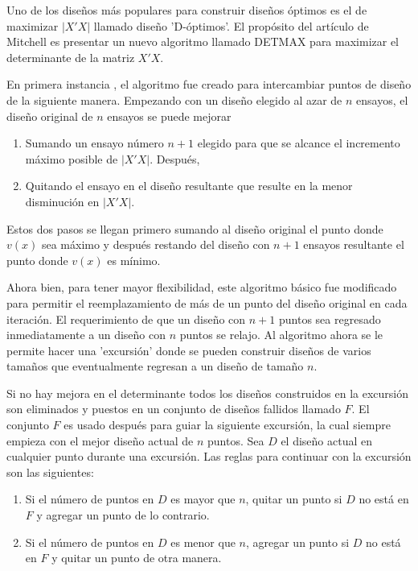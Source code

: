 Uno de los diseños más populares para construir diseños óptimos es el de maximizar $|X'X|$ llamado diseño 'D-óptimos'.  El propósito del artículo de Mitchell es presentar un nuevo algoritmo llamado DETMAX para maximizar el determinante de la matriz $X'X$. 

En primera instancia , el algoritmo fue creado para intercambiar puntos de diseño de la siguiente manera. Empezando con un diseño elegido al azar de $n$ ensayos, el diseño original de $n$ ensayos se puede mejorar 


\begin{enumerate}
	\item Sumando un ensayo número $n+1$ elegido para que se alcance el incremento máximo posible de $|X'X|$. Después, 
	\item Quitando el ensayo en el diseño resultante que resulte en la menor disminución en  $|X'X|$. 
\end{enumerate}

Estos dos pasos se llegan primero sumando al diseño original el punto donde $v(x)$ sea máximo y después restando del diseño con $n+1$ ensayos resultante el punto donde $v(x)$ es mínimo.


Ahora bien, para tener mayor flexibilidad, este algoritmo básico fue modificado para permitir el reemplazamiento de más de un punto del diseño original en cada iteración. El requerimiento de que un diseño con $n+1$ puntos sea regresado inmediatamente a un diseño con $n$ puntos se relajo. Al algoritmo ahora se le permite hacer una 'excursión' donde se pueden construir diseños de varios tamaños que eventualmente regresan a un diseño de tamaño $n$.  

Si no hay mejora en el determinante todos los diseños construidos en la excursión son eliminados y puestos en un conjunto de diseños fallidos llamado $F$. El conjunto $F$ es usado después para guiar la siguiente excursión, la cual siempre empieza con el mejor diseño actual de $n$ puntos. 
Sea $D$ el diseño actual en cualquier punto durante una excursión. Las reglas para continuar con la excursión son las siguientes:

\begin{enumerate}
	\item Si el número de puntos en $D$ es mayor que $n$, quitar un punto si $D$ no está en $F$ y agregar un punto de lo contrario. 
	
	\item Si el número de puntos en $D$ es menor que $n$, agregar un punto si $D$ no está en $F$ y quitar un punto de otra manera. 
\end{enumerate}

